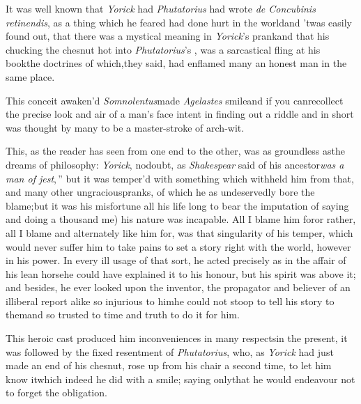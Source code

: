 \documentclass[twoside]{article}
\begin{document}
It was well known that \textit{Yorick} had\break
{}\break
\textit{Phutatorius} had wrote \textit{de Concubinis
retinendis}, as a thing which he feared had done hurt in the
world\tsk and ’twas easily found out, that there was a
mystical meaning in \textit{Yorick}’s prank\tsk and that his
chucking the chesnut hot into \textit{Phutatorius}’s
\hbox{\tsk{}}, 
was a sarcastical fling at his book\tsk the doctrines
of which,\break they said, had enflamed many an honest man in the
same place.

This conceit awaken’d \textit{Somnolentus}\tsh made
\textit{Agelastes} smile\tsk and if you can\break recollect the
precise look and air of a man’s face intent in finding out a
riddle\tsk{} and in short was thought by many to be a master-stroke
of arch-wit.

This, as the reader has seen from one end to the other, was as
groundless as\break the dreams of philosophy: \textit{Yorick}, no\break doubt, as
\textit{Shakespear} said of his ancestor\break\tsk\lqq\textit{was
a man of jest},\,” but it was tem\-per’d with something
which withheld him\break
from that, and many other ungracious\break pranks, of
which he as undeservedly\break
bore the blame;\tsk but it was his
misfortune all his life long to bear the imputation of saying and
doing a thousand  me) his
nature was incapable. All I
blame him for\tsk or rather, all I blame and alternately like him for, was that
singularity of his temper, which would never suffer him to take pains to set a story
right with the world, however in his power. In every ill usage of that sort, he
acted precisely as in the affair of his lean horse\tsk he could have explained it to
his honour, but his spirit was above it; and besides, he ever looked upon the
inventor, the propagator and believer of an illiberal report alike so injurious to
him\tsk he could not stoop to tell his story to them\tsk and so trusted to time and
truth to do it for him.

This heroic cast produced him inconveniences in many
respects\tsk in the pre\-sent, it was followed by the fixed
resentment of \textit{Phutatorius}, who, as \textit{Yorick} had just
made an end of his chesnut, rose up from his chair a second time,
to let him know it\tsk which indeed he did with a smile; saying
only\tsk that he would endeavour not to forget the
obligation.
\end{document}
